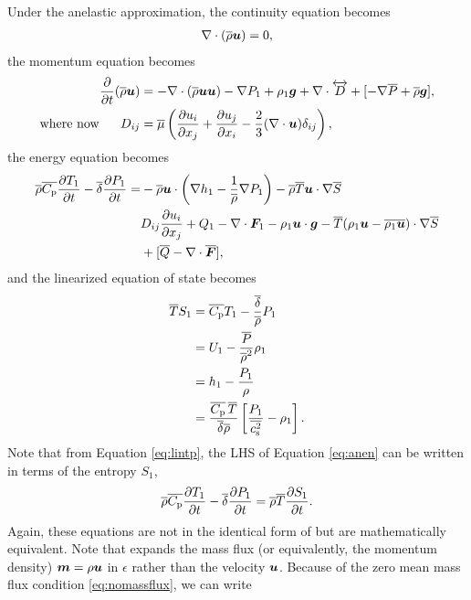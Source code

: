 \documentclass[12pt]{article}
\newcommand{\vecf}{\bm{F}}
\newcommand{\deltaref}{\overline{\delta}}
\newcommand{\cpref}{\overline{\cpcap}}
\newcommand{\cssqref}{\overline{\cs^2}}
\begin{document}
	Under the anelastic approximation, the continuity equation becomes
	\begin{align}\label{eq:ancont}
		\nabla\cdot(\overline{\rho}\bm{u})= 0,
	\end{align}
	the momentum equation becomes 
	\begin{subequations}\label{eq:anmom}
	\begin{align}
		\frac{\partial}{\partial t}(\overline{\rho}\bm{u})&=-\nabla\cdot(\overline{\rho}\bm{u}\bm{u}) - \nabla P_1 +\rho_1\bm{g} +\nabla\cdot \overleftrightarrow{D}+[-\nabla\overline{P} + \overline{\rho}\bm{g}],\label{eq:anmommain}\\
		\text{where now}\ \ \ \ \  D_{ij}& = \overline{\mu}\left(\frac{\partial u_i}{\partial x_j} + \frac{\partial u_j}{\partial x_i} - \frac{2}{3}(\nabla\cdot\bm{u})\delta_{ij}\right)\label{eq:anmomvisc},
	\end{align}
	\end{subequations}
	the energy equation becomes 
	\begin{align}\label{eq:anen}
		\rhoref\cpref\pderiv{T_1}{t} - \deltaref\pderiv{P_1}{t} = &-\rhoref\vecu\cdot\left(\nabla h_1-\frac{1}{\rhoref}\nabla P_1\right) - \rhoref \tmpref \ugrad \sref\nonumber\\
		& D_{ij}\pderiv{u_i}{x_j} + Q _1- \Div\vecf_1 -\rho_1\vecu\cdot\vecg - \tmpref(\rho_1\vecu-\overline{\rho_1\vecu})\cdot\nabla\sref\nonumber\\
		&+ [\qref - \Div\overline{\vecf}],
	\end{align}
  and the linearized equation of state becomes
  \begin{subequations}\label{eq:aneos}
  \begin{align}
  	\tmpref S_1 &= \cpref T_1 - \frac{\deltaref}{\rhoref} P_1\label{eq:lintp}\\
  	&= U_1 - \frac{\prsref}{\rhoref^2}\rho_1 \label{eq:linu}\\
  	&= h_1 - \frac{P_1}{\rho}\\
  	&= \frac{\cpref\, \tmpref}{\deltaref\rhoref}\left[\frac{P_1}{\cssqref}-\rho_1\right].
  \end{align}
  \end{subequations}
  Note that from Equation \eqref{eq:lintp}, the LHS of Equation \eqref{eq:anen} can be written in terms of the entropy $S_1$, 
  \begin{align}\label{eq:anenlhs}
  	\rhoref\cpref\pderiv{T_1}{t} - \deltaref\pderiv{P_1}{t} = \rhoref\tmpref\pderiv{S_1}{t}.
  \end{align}
  Again, these equations are not in the identical form of \citet{Gough1969} but are mathematically equivalent. Note that \citet{Gough1969} expands the mass flux (or equivalently, the momentum density) $\bm{m}=\rho\bm{u}$ in $\epsilon$ rather than the velocity $\bm{u}$. Because of the zero mean mass flux condition \eqref{eq:nomassflux}, we can write
\end{document}
